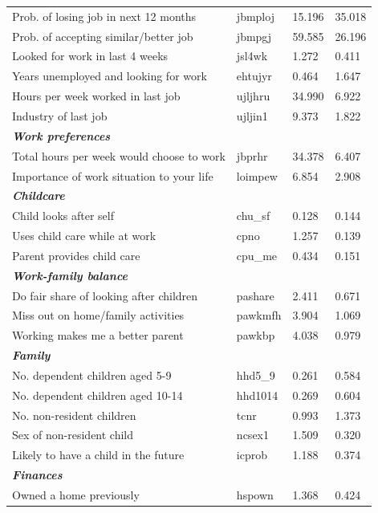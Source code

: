 \documentclass[12pt, a4paper]{article}
\begin{document}
\begin{longtable}{p{} C{0.15\textwidth} C{0.15\textwidth} C{0.15\textwidth}}
Prob.  of losing job in next 12 months 	& 	jbmploj	 & 	15.196	 & 	35.018	 \\
Prob.  of accepting similar/better job 	& 	jbmpgj	 & 	59.585	 & 	26.196	 \\
Looked for work in last 4 weeks 	& 	jsl4wk	 & 	1.272	 & 	0.411	 \\
Years unemployed and looking for work	& 	ehtujyr	 & 	0.464	 & 	1.647	 \\
Hours per week worked in last job 	& 	ujljhru	 & 	34.990	 & 	6.922	 \\
Industry of last job 	& 	ujljin1	 & 	9.373	 & 	1.822	 \\
\textbf{\textit{Work preferences}} 	& 		 & 		 & 		 \\
Total hours per week would choose to work 	& 	jbprhr	 & 	34.378	 & 	6.407	 \\
Importance of work situation to your life 	& 	loimpew	 & 	6.854	 & 	2.908	 \\
\textbf{\textit{Childcare}} 	& 		 & 		 & 		 \\
Child looks after self 	& 	chu\_sf	 & 	0.128	 & 	0.144	 \\
Uses child care while at work	& 	cpno	 & 	1.257	 & 	0.139	 \\
Parent provides child care 	& 	cpu\_me 	 & 	0.434	 & 	0.151	 \\
\textbf{\textit{Work-family balance}} 	& 		 & 		 & 		 \\
Do fair share of looking after children 	& 	pashare	 & 	2.411	 & 	0.671	 \\
Miss out on home/family activities 	& 	pawkmfh	 & 	3.904	 & 	1.069	 \\
Working makes me a better parent 	& 	pawkbp	 & 	4.038	 & 	0.979	 \\
\textbf{\textit{Family}} 	& 		 & 		 & 		 \\
No.  dependent children aged 5-9 	& 	hhd5\_9	 & 	0.261	 & 	0.584	 \\
No.  dependent children aged 10-14 	& 	hhd1014	 & 	0.269	 & 	0.604	 \\
No.  non-resident children 	& 	tcnr	 & 	0.993	 & 	1.373	 \\
Sex of non-resident child 	& 	ncsex1	 & 	1.509	 & 	0.320	 \\
Likely to have a child in the future 	& 	icprob	 & 	1.188	 & 	0.374	 \\
\textbf{\textit{Finances}} 	& 		 & 		 & 		 \\
Owned a home previously 	& 	hspown	 & 	1.368	 & 	0.424	 \\

\end{longtable}
\end{document}
